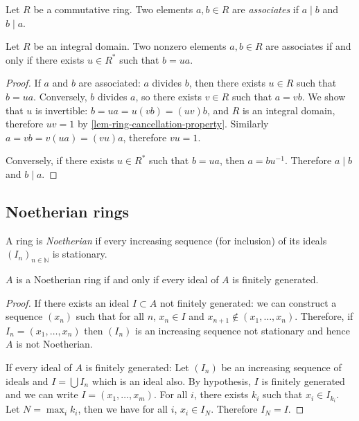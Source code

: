 \documentclass[12pt]{report}
\begin{document}
\begin{definition} \label{def-ring-associated-elements}
    Let $R$ be a commutative ring. Two elements $a, b \in R$ are \emph{associates} if $a \mid b$ and $b \mid a$.
\end{definition}

\begin{proposition} \label{prop-ring-associated-elements-eq}
    Let $R$ be an integral domain. Two nonzero elements $a, b \in R$ are associates if and only if there exists $u \in R^{\ast}$ such that $b = u a$.
\end{proposition}

\begin{proof}
    If $a$ and $b$ are associated: $a$ divides $b$, then there exists $u \in R$ such that $b = u a$. Conversely, $b$ divides $a$, so there exists $v \in R$ such that $a = v b$. We show that $u$ is invertible: 
    $b = u a = u (v b) = (u v) b$, and $R$ is an integral domain, therefore $u v = 1$ by \ref{lem-ring-cancellation-property}. Similarly $a = v b = v (u a) = (v u) a$, therefore $v u = 1$.

    Conversely, if there exists $u \in R^{\ast}$ such that $b = u a$, then $a = b u^{-1}$. Therefore $a \mid b$ and $b \mid a$.
\end{proof}

\subsection{Noetherian rings}

\begin{definition} \label{def-Noetherian-ring}
    A ring is \emph{Noetherian} if every increasing sequence (for inclusion) of its ideals $(I_n)_{n \in \mathbb{N}}$ is stationary.
\end{definition}

\begin{proposition} \label{prop-Noetherian-ring-eq}
    $A$ is a Noetherian ring if and only if every ideal of $A$ is finitely generated.
\end{proposition}

\begin{proof}
    If there exists an ideal $I \subset A$ not finitely generated: we can construct a sequence $(x_n)$ such that for all $n$, $x_n \in I$ and $x_{n + 1} \not \in (x_1, \dots, x_n)$. Therefore, if $I_n = (x_1, \dots, x_n)$ then $(I_n)$ is an increasing sequence not stationary and hence $A$ is not Noetherian.

    If every ideal of $A$ is finitely generated: Let $(I_n)$ be an increasing sequence of ideals and $I = \bigcup I_n$ which is an ideal also. By hypothesis, $I$ is finitely generated and we can write $I = (x_1, \dots, x_m)$. For all $i$, there exists $k_i$ such that $x_i \in I_{k_i}$. Let $N = \max_i k_i$, then we have for all $i$, $x_i \in I_N$. Therefore $I_N = I$.
\end{proof}
\end{document}
